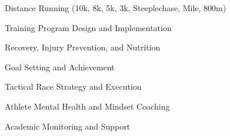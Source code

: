 \item Distance Running (10k, 8k, 5k, 3k, Steeplechase, Mile, 800m)
\item Training Program Design and Implementation
\item Recovery, Injury Prevention, and Nutrition
\item Goal Setting and Achievement
\item Tactical Race Strategy and Execution
\item Athlete Mental Health and Mindset Coaching
\item Academic Monitoring and Support